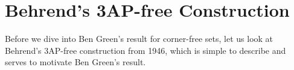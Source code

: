 \section{Behrend's 3AP-free Construction}

Before we dive into Ben Green's result for corner-free sets, let us look at Behrend's 3AP-free construction from 1946, which is simple to describe and serves to motivate Ben Green's result.


